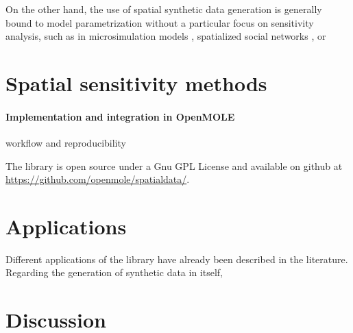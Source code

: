 \documentclass[11pt]{article}
\begin{document}
On the other hand, the use of spatial synthetic data generation is generally bound to model parametrization without a particular focus on sensitivity analysis, such as in microsimulation models \citep{smith2009improving}, spatialized social networks \citep{barrett2009generation}, or  


\section{Spatial sensitivity methods}


\paragraph{Implementation and integration in OpenMOLE}

\cite{reuillon2019fostering}
\cite{reuillon2013openmole}
\cite{passerat2017reproducible} workflow and reproducibility

The library is open source under a Gnu GPL License and available on github at \url{https://github.com/openmole/spatialdata/}.

\section{Applications}

Different applications of the library have already been described in the literature. Regarding the generation of synthetic data in itself, 


\cite{raimbault2019second}

\cite{raimbault2019space}



\section{Discussion}






\end{document}

